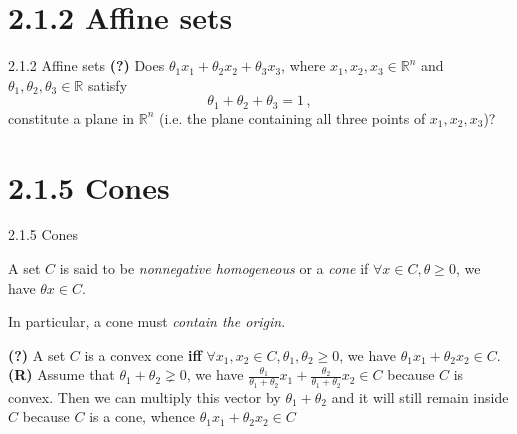 \documentclass{beamer}
\begin{document}
\section{2.1.2 Affine sets}
\begin{frame}{2.1.2 Affine sets}
  \textbf{(?)} Does $\theta_{1} x_{1} + \theta_{2} x_{2} + \theta_{3} x_{3}$, where $x_{1}, x_{2}, x_{3} \in \mathbb{R}^{n}$
  and $\theta_{1}, \theta_{2}, \theta_{3} \in \mathbb{R}$ satisfy
  $$
    \theta_{1} + \theta_{2} + \theta_{3} = 1\,,
  $$
  constitute a plane in $\mathbb{R}^{n}$ (i.e. the plane containing all three points of $x_{1}, x_{2}, x_{3}$)?
\end{frame}


\section{2.1.5 Cones}
\begin{frame}{2.1.5 Cones}
  \begin{definition}
    A set $C$ is said to be \textit{nonnegative homogeneous} or a \textit{cone} if $\forall x \in C, \theta \ge 0$, we
    have $\theta x \in C$.
  \end{definition}

  In particular, a cone must \textit{contain the origin}.

    \textbf{(?)} A set $C$ is a convex cone \textbf{iff} $\forall x_{1}, x_{2} \in C, \theta_{1}, \theta_{2} \ge 0$, we have
    $\theta_{1}x_{1} + \theta_{2}x_{2} \in C$.\\
    \textbf{(R)} Assume that $\theta_{1} + \theta_{2} \gneq 0$, we have
    $
      \frac{\theta_{1}}{\theta_{1} + \theta_{2}} x_{1}
      + \frac{\theta_{2}}{\theta_{1} + \theta_{2}} x_{2} \in C
    $ because $C$ is convex. Then we can multiply this vector by $\theta_{1} + \theta_{2}$ and
    it will still remain inside $C$ because $C$ is a cone, whence $\theta_{1}x_{1} + \theta_{2}x_{2} \in C$
\end{frame}
\end{document}
